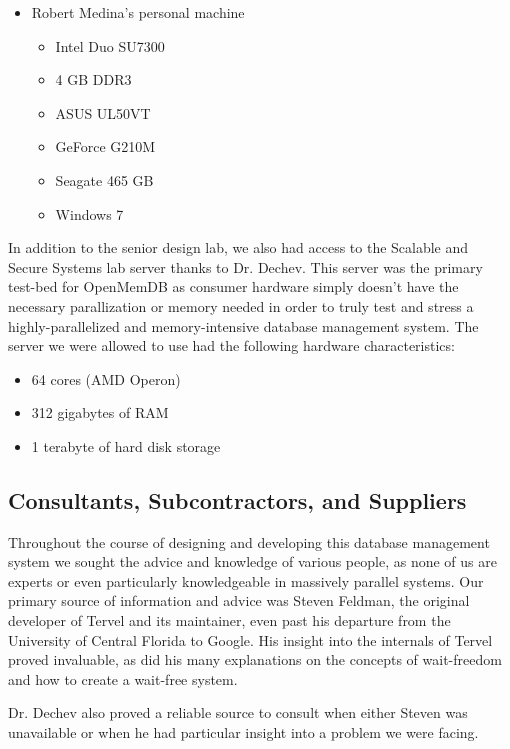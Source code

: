 \documentclass[letterpaper, 12pt]{article}
\begin{document}
\begin{itemize}
 \item Robert Medina's personal machine
 \begin{itemize}
  \item{ Intel Duo SU7300}
  \item{ 4 GB DDR3}
  \item{ ASUS UL50VT}
  \item{ GeForce G210M}
  \item{ Seagate 465 GB}
  \item{ Windows 7}
 \end{itemize}

\end{itemize}
\par\vspace{\baselineskip}
In addition to the senior design lab, we also had access to the Scalable and Secure Systems lab server
thanks to Dr. Dechev. This server was the primary test-bed for OpenMemDB as consumer hardware simply
doesn't have the necessary parallization or memory needed in order to truly test and stress a
highly-parallelized and memory-intensive database management system. The server we were allowed to
use had the following hardware characteristics:
\begin{itemize}
 \item 64 cores (AMD Operon)
 \item 312 gigabytes of RAM
 \item 1 terabyte of hard disk storage
\end{itemize}

\newpage

\subsection{Consultants, Subcontractors, and Suppliers}
Throughout the course of designing and developing this database management system we sought the advice
and knowledge of various people, as none of us are experts or even particularly knowledgeable in
massively parallel systems. Our primary source of information and advice was Steven Feldman, the
original developer of Tervel and its maintainer, even past his departure from the University of Central
Florida to Google. His insight into the internals of Tervel proved invaluable, as did his many
explanations on the concepts of wait-freedom and how to create a wait-free system.
\par\vspace{\baselineskip}
Dr. Dechev also proved a reliable source to consult when either Steven was unavailable or when he
had particular insight into a problem we were facing.
\newpage
\end{document}
